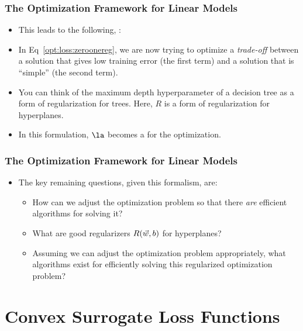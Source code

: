 \documentclass[trans,aspectratio=169]{beamer}
\begin{document}
\begin{frame}
  \frametitle{The Optimization Framework for Linear Models}
\begin{itemize}
\item 
This leads to the following, :
%
%
\item
In Eq~\eqref{opt:loss:zeroonereg}, we are now trying to optimize a
\emph{trade-off} between a solution that gives low training error (the
first term) and a solution that is ``simple'' (the second term). 
\item You
can think of the maximum depth hyperparameter of a decision tree as a
form of regularization for trees.  Here, $R$ is a form of
regularization for hyperplanes.  
\item In this formulation, $\la$ becomes a
 for the optimization.
\end{itemize}
\end{frame}


\begin{frame}
  \frametitle{The Optimization Framework for Linear Models}
\begin{itemize}
\item 
The key remaining questions, given this formalism, are:
\begin{itemize}
\item How can we adjust the optimization problem so that there
  \emph{are} efficient algorithms for solving it?
\item What are good regularizers $R({\vec w},b)$ for hyperplanes?
\item Assuming we can adjust the optimization problem appropriately,
  what algorithms exist for efficiently solving this regularized
  optimization problem?
\end{itemize}
\end{itemize}
\end{frame}

\section{Convex Surrogate Loss Functions}
\end{document}
